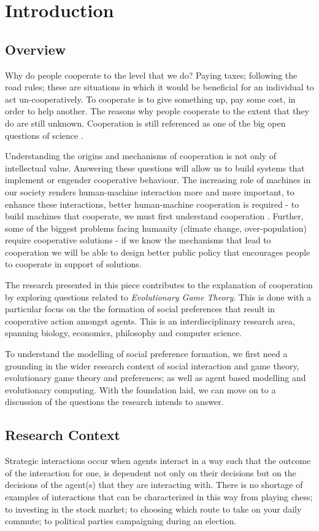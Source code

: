 \documentclass[11pt]{book}
\newcommand*{\np}{\par\noindent\newline}
\begin{document}
\tableofcontents
\newpage
\listoffigures
\chapter{Introduction}
\section{Overview}\label{overview}
Why do people cooperate to the level that we do? Paying taxes; following the road rules; these are situations in which it would be beneficial for an individual to act un-cooperatively.
To cooperate is to give something up, pay some cost, in order to help another.
The reasons why people cooperate to the extent that they do are still unknown. 
Cooperation is still referenced as one of the big open questions of science \citep{pennisi_how_2005}.

\np Understanding the origins and mechanisms of cooperation is not only of intellectual value.
Answering these questions will allow us to build systems that implement or engender cooperative behaviour. 
The increasing role of machines in our society renders human-machine interaction more and more important, to enhance these interactions, better human-machine cooperation is required -
 to build machines that cooperate, we must first understand cooperation \citep{hoc_human_2000}.
Further, some of the biggest problems facing humanity (climate change, over-population) require cooperative solutions - 
if we know the mechanisms that lead to cooperation we will be able to design better public policy that encourages people to cooperate in support of solutions.

\np The research presented in this piece contributes to the explanation of cooperation by exploring questions related to \textit{Evolutionary Game Theory}.
This is done with a particular focus on the the formation of social preferences that result in cooperative action amongst agents.
This is an interdisciplinary research area, spanning biology, economics, philosophy and computer science.

\np To understand the modelling of social preference formation, we first need a grounding in the wider research context of social interaction and game theory, evolutionary game theory and preferences; as well as agent based modelling and evolutionary computing. 
With the foundation laid, we can move on to a discussion of the questions the research intends to answer.

\section{Research Context}
Strategic interactions occur when agents interact in a way such that the outcome of the interaction for one, is dependent not only on their decisions but on the decisions of the agent(s) that they are interacting with.
There is no shortage of examples of interactions that can be characterized in this way from playing chess;
to investing in the stock market; to choosing which route to take on your daily commute; to political parties campaigning during an election.
\end{document}
